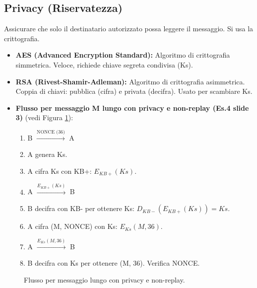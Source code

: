 \subsection{Privacy (Riservatezza)}
Assicurare che solo il destinatario autorizzato possa leggere il messaggio. Si usa la crittografia.
\begin{itemize}
    \item \textbf{AES (Advanced Encryption Standard):} Algoritmo di crittografia simmetrica. Veloce, richiede chiave segreta condivisa (Ks).
    \item \textbf{RSA (Rivest-Shamir-Adleman):} Algoritmo di crittografia asimmetrica. Coppia di chiavi: pubblica (cifra) e privata (decifra). Usato per scambiare Ks.
    \item \textbf{Flusso per messaggio M lungo con privacy e non-replay (Es.4 slide 3)} (vedi Figura \ref{fig:privacy_flow}):
    \begin{enumerate}
        \item B $\xrightarrow{\text{NONCE (36)}}$ A
        \item A genera Ks.
        \item A cifra Ks con KB+: $E_{KB+}(Ks)$.
        \item A $\xrightarrow{E_{KB+}(Ks)}$ B
        \item B decifra con KB- per ottenere Ks: $D_{KB-}(E_{KB+}(Ks)) = Ks$.
        \item A cifra (M, NONCE) con Ks: $E_{Ks}(M, 36)$.
        \item A $\xrightarrow{E_{Ks}(M, 36)}$ B
        \item B decifra con Ks per ottenere (M, 36). Verifica NONCE.
    \end{enumerate}
\end{itemize}

\begin{figure}[H]
\centering
{}
\caption{Flusso per messaggio lungo con privacy e non-replay.}
\label{fig:privacy_flow}
\end{figure}

